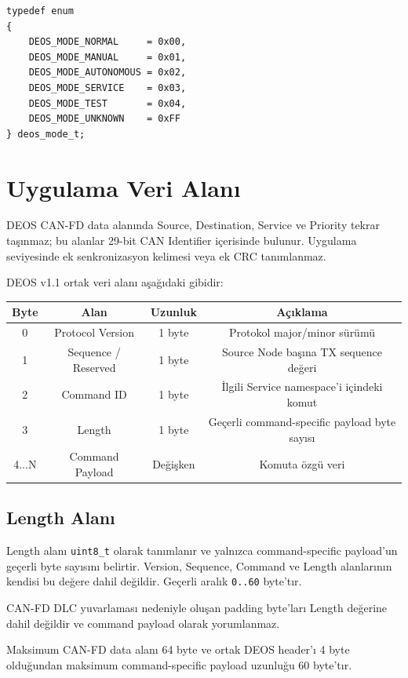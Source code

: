 \documentclass[a4paper,10pt]{article}
\newcommand{\code}[1]{\texttt{#1}}
\begin{document}
\begin{lstlisting}[style=cstyle]
typedef enum
{
    DEOS_MODE_NORMAL     = 0x00,
    DEOS_MODE_MANUAL     = 0x01,
    DEOS_MODE_AUTONOMOUS = 0x02,
    DEOS_MODE_SERVICE    = 0x03,
    DEOS_MODE_TEST       = 0x04,
    DEOS_MODE_UNKNOWN    = 0xFF
} deos_mode_t;
\end{lstlisting}

\section{Uygulama Veri Alanı}

DEOS CAN-FD data alanında Source, Destination, Service ve Priority tekrar taşınmaz; bu
alanlar 29-bit CAN Identifier içerisinde bulunur. Uygulama seviyesinde ek senkronizasyon
kelimesi veya ek CRC tanımlanmaz.

DEOS v1.1 ortak veri alanı aşağıdaki gibidir:

\begin{center}
\begin{tabular}{c c c c}
\toprule
Byte & Alan & Uzunluk & Açıklama \\
\midrule
0 & Protocol Version & 1 byte & Protokol major/minor sürümü \\
1 & Sequence / Reserved & 1 byte & Source Node başına TX sequence değeri \\
2 & Command ID & 1 byte & İlgili Service namespace'i içindeki komut \\
3 & Length & 1 byte & Geçerli command-specific payload byte sayısı \\
4...N & Command Payload & Değişken & Komuta özgü veri \\
\bottomrule
\end{tabular}
\end{center}

\subsection{Length Alanı}

Length alanı \code{uint8\_t} olarak tanımlanır ve yalnızca command-specific payload'un
geçerli byte sayısını belirtir. Version, Sequence, Command ve Length alanlarının kendisi
bu değere dahil değildir. Geçerli aralık \code{0..60} byte'tır.

CAN-FD DLC yuvarlaması nedeniyle oluşan padding byte'ları Length değerine dahil değildir
ve command payload olarak yorumlanmaz.

Maksimum CAN-FD data alanı 64 byte ve ortak DEOS header'ı 4 byte olduğundan maksimum
command-specific payload uzunluğu 60 byte'tır.
\end{document}
